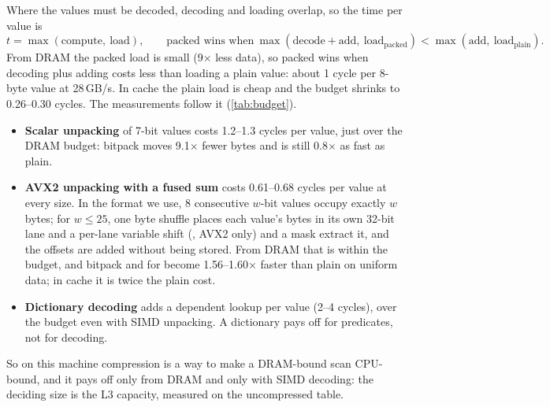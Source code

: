 Where the values must be decoded, decoding and loading overlap, so the time per value is
\[
  t = \max(\text{compute},\ \text{load}),\qquad
  \text{packed wins when}\ \max(\text{decode}+\text{add},\ \text{load}_\text{packed})
  < \max(\text{add},\ \text{load}_\text{plain}).
\]
From DRAM the packed load is small (9$\times$ less data), so packed wins when decoding plus
adding costs less than loading a plain value: about 1 cycle per 8-byte value at 28\,GB/s. In
cache the plain load is cheap and the budget shrinks to 0.26--0.30 cycles. The measurements
follow it (\cref{tab:budget}).
\begin{itemize}
\item \textbf{Scalar unpacking} of 7-bit values costs 1.2--1.3 cycles per value, just over the
DRAM budget: bitpack moves 9.1$\times$ fewer bytes and is still 0.8$\times$ as fast as plain.
\item \textbf{AVX2 unpacking with a fused sum} costs 0.61--0.68 cycles per value at every size.
In the format we use, 8 consecutive $w$-bit values occupy exactly $w$ bytes; for $w \le 25$,
one byte shuffle places each value's bytes in its own 32-bit lane and a per-lane variable
shift (, AVX2 only) and a mask extract it, and the offsets are added without
being stored. From DRAM that is within the budget, and bitpack and for become
1.56--1.60$\times$ faster than plain on uniform data; in cache it is twice the plain cost.
\item \textbf{Dictionary decoding} adds a dependent lookup per value (2--4 cycles), over the
budget even with SIMD unpacking. A dictionary pays off for predicates, not for decoding.
\end{itemize}
So on this machine compression is a way to make a DRAM-bound scan CPU-bound, and it pays off
only from DRAM and only with SIMD decoding: the deciding size is the L3 capacity, measured on
the uncompressed table.
